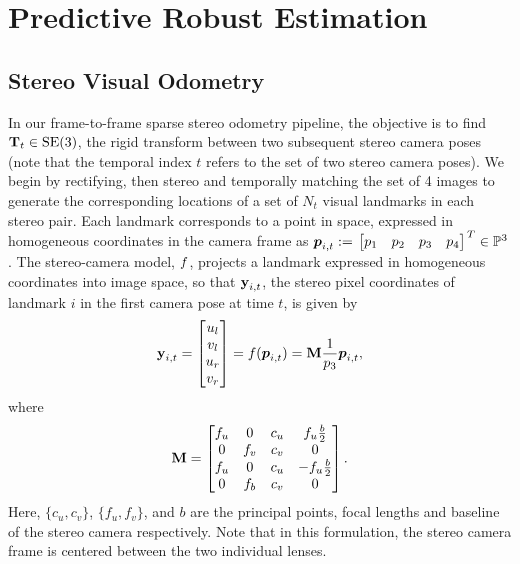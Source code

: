 \chapter{Predictive Robust Estimation}
\section{Stereo Visual Odometry}

In our frame-to-frame sparse stereo odometry pipeline,  the objective is to find
$\boldsymbol{\mathbf{T}}_t\in\text{SE}(3)$, the rigid transform between two subsequent stereo camera poses (note that the temporal index $t$ refers to the set of two stereo camera poses). We begin by rectifying, then stereo and temporally
matching the set of 4 images to generate the corresponding locations of a set
of $N_t$ visual landmarks in each stereo pair.  Each landmark corresponds to a
point in space, expressed in homogeneous coordinates in the camera frame as
$\HomogeneousPoint{i}{t} := \Transpose{\bbm p_1 & p_2 & p_3 & p_4 \ebm} \in
\HomogeneousNumbers[3]$.  The stereo-camera model, $f$,
projects a landmark expressed in homogeneous coordinates into image space, so
that $\boldsymbol{\mathbf{y}}_{i,t}$, the stereo pixel coordinates of landmark $i$ in the first camera pose at time $t$, is given
by 
\begin{equation}
	\boldsymbol{\mathbf{y}}_{i,t} = \begin{bmatrix} u_l \\ v_l \\ u_r \\ v_r \end{bmatrix} 
  = f(\boldsymbol{p}_{i,t}) 
  = \boldsymbol{\mathbf{M}} \frac{1}{p_3}\boldsymbol{p}_{i,t},
\end{equation}
where
\begin{equation}
 \boldsymbol{\mathbf{M}} = \begin{bmatrix} f_u & 0 & c_u & f_u \frac{b}{2} \\ 0 & f_v & c_v & 0 \\ f_u 
                        & 0 & c_u & -f_u\frac{b}{2} \\ 0 & f_b & c_v & 0 \end{bmatrix}.
\end{equation}
Here, $\{c_u, c_v\}$, $\{f_u, f_v\}$, and $b$ are the principal points, focal
lengths and baseline of the stereo camera respectively. Note that in this
formulation, the stereo camera frame is centered between the two individual
lenses.  

